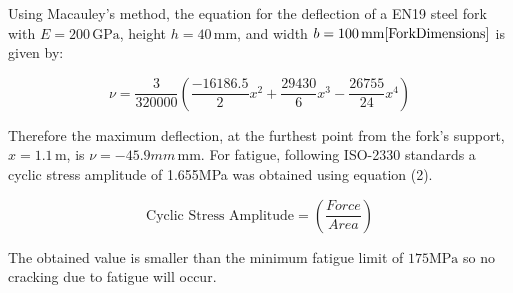 \documentclass[12pt]{article}
\begin{document}
Using Macauley's method, the equation for the deflection of a EN19 steel fork with \( E = 200 \, \text{GPa} \), height \( h = 40 \, \text{mm} \), and width \( b = 100 \, \text{mm} \cite{ForkDimensions} \) is given by:

\vspace{-20pt}
\begin{equation}
   \nu = \frac{3}{320000} \left( \frac{-16186.5}{2}x^2 + \frac{29430}{6}x^3 - \frac{26755}{24}x^4 \right)
\end{equation}
\vspace{-20pt}

Therefore the maximum deflection, at the furthest point from the fork's support, \(x = 1.1 \, \text{m}\), is \(\nu = -45.9mm \, \text{mm}\).
For fatigue, following ISO-2330 standards a cyclic stress amplitude of 1.655MPa was obtained using equation (2).

\vspace{-20pt}
\begin{equation}
   \text{Cyclic Stress Amplitude} = \left (\frac{Force}{Area} \right)
\end{equation}
\vspace{-20pt}

The obtained value is smaller than the minimum fatigue limit of \(175 \text{MPa}\) so no cracking due to fatigue will occur.
\end{document}
